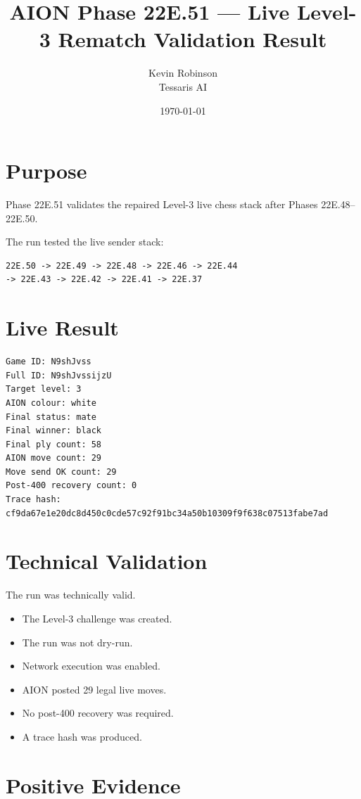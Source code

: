 \documentclass[11pt,a4paper]{article}
\title{\textbf{AION Phase 22E.51 --- Live Level-3 Rematch Validation Result}}
\author{Kevin Robinson\\Tessaris AI}
\date{\today}
\begin{document}
\maketitle

\section{Purpose}

Phase 22E.51 validates the repaired Level-3 live chess stack after Phases 22E.48--22E.50.

The run tested the live sender stack:

\begin{verbatim}
22E.50 -> 22E.49 -> 22E.48 -> 22E.46 -> 22E.44
-> 22E.43 -> 22E.42 -> 22E.41 -> 22E.37
\end{verbatim}

\section{Live Result}

\begin{verbatim}
Game ID: N9shJvss
Full ID: N9shJvssijzU
Target level: 3
AION colour: white
Final status: mate
Final winner: black
Final ply count: 58
AION move count: 29
Move send OK count: 29
Post-400 recovery count: 0
Trace hash: cf9da67e1e20dc8d450c0cde57c92f91bc34a50b10309f9f638c07513fabe7ad
\end{verbatim}

\section{Technical Validation}

The run was technically valid.

\begin{itemize}
  \item The Level-3 challenge was created.
  \item The run was not dry-run.
  \item Network execution was enabled.
  \item AION posted 29 legal live moves.
  \item No post-400 recovery was required.
  \item A trace hash was produced.
\end{itemize}

\section{Positive Evidence}
\end{document}

